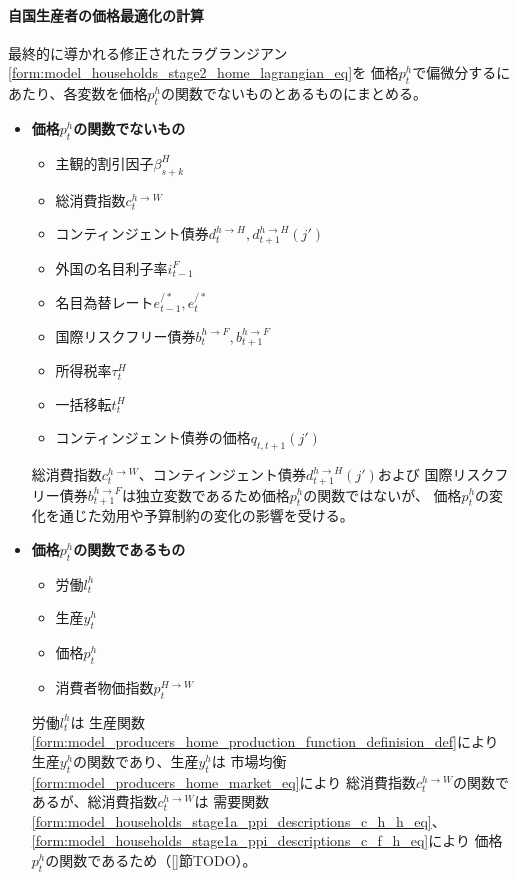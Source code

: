 \paragraph{自国生産者の価格最適化の計算}
\label{sec:chapter3_assumptions_price_optimization_home_caliculation}
最終的に導かれる修正されたラグランジアン\eqref{form:model_households_stage2_home_lagrangian_eq}を
価格\(p_t^h\)で偏微分するにあたり、各変数を価格\(p_t^h\)の関数でないものとあるものにまとめる。
\begin{itemize}
    \item
    \label{itm:chapter3_assumptions_price_optimization_home_caliculation_remark1}
        \textbf{価格\(p_t^h\)の関数でないもの}
        \begin{itemize}
            \item 主観的割引因子\(\beta_{s+k}^H\)
            \item 総消費指数\(c_t^{h\to W}\)
            \item コンティンジェント債券\(d_t^{h\to H}, d_{t+1}^{h\to H}(j')\)
            \item 外国の名目利子率\(i_{t-1}^F\)
            \item 名目為替レート\(e_{t-1}^{/*}, e_t^{/*}\)
            \item 国際リスクフリー債券\(b_t^{h\to F}, b_{t+1}^{h\to F}\)
            \item 所得税率\(\tau_t^H\)
            \item 一括移転\(t_t^H\)
            \item コンティンジェント債券の価格\(q_{t,t+1}(j')\)
        \end{itemize}
        総消費指数\(c_t^{h\to W}\)、コンティンジェント債券\(d_{t+1}^{h\to H}(j')\)および
        国際リスクフリー債券\(b_{t+1}^{h\to F}\)は独立変数であるため価格\(p_t^h\)の関数ではないが、
        価格\(p_t^h\)の変化を通じた効用や予算制約の変化の影響を受ける。
    \item
    \label{itm:chapter3_assumptions_price_optimization_home_caliculation_remark2}
        \textbf{価格\(p_t^h\)の関数であるもの}
        \begin{itemize}
            \item 労働\(l_t^h\)
            \item 生産\(y_t^h\)
            \item 価格\(p_t^h\)
            \item 消費者物価指数\(p_t^{H\to W}\)
        \end{itemize}
        労働\(l_t^h\)は
        生産関数\eqref{form:model_producers_home_production_function_definision_def}により
        生産\(y_t^h\)の関数であり、生産\(y_t^h\)は
        市場均衡\eqref{form:model_producers_home_market_eq}により
        総消費指数\(c_t^{h\to W}\)の関数であるが、総消費指数\(c_t^{h\to W}\)は
        需要関数
        \eqref{form:model_households_stage1a_ppi_descriptions_c_h_h_eq}、
        \eqref{form:model_households_stage1a_ppi_descriptions_c_f_h_eq}により
        価格\(p_t^h\)の関数であるため（\ref{}節TODO）。
\end{itemize}
